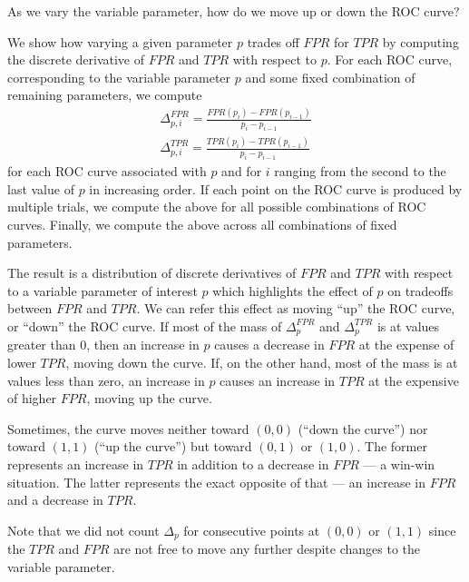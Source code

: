 As we vary the variable parameter, how do we move up or down the ROC curve?

We show how varying a given parameter $p$ trades off $FPR$ for $TPR$ by
computing the discrete derivative of $FPR$ and $TPR$ with respect to $p$. For
each ROC curve, corresponding to the variable parameter $p$ and some fixed
combination of remaining parameters, we compute
\begin{gather}
\Delta_{p,i}^{FPR} = \frac{FPR(p_{i}) - FPR(p_{i-1})}{p_i - p_{i-1}}\\
\Delta_{p,i}^{TPR} = \frac{TPR(p_{i}) - TPR(p_{i-1})}{p_i - p_{i-1}}
\end{gather}
for each ROC curve associated with $p$ and for $i$ ranging from the second to
the last value of $p$ in increasing order. If each point on the ROC curve is
produced by multiple trials, we compute the above for all possible combinations
of ROC curves. Finally, we compute the above across all combinations of fixed
parameters.

The result is a distribution of discrete derivatives of $FPR$ and $TPR$ with
respect to a variable parameter of interest $p$ which highlights the effect of
$p$ on tradeoffs between $FPR$ and $TPR$. We can refer this effect as moving
``up'' the ROC curve, or ``down'' the ROC curve. If most of the mass of
$\Delta_{p}^{FPR}$ and $\Delta_{p}^{TPR}$ is at values greater than 0, then an
increase in $p$ causes a decrease in $FPR$ at the expense of lower $TPR$, moving
down the curve. If, on the other hand, most of the mass is at values less than
zero, an increase in $p$ causes an increase in $TPR$ at the expensive of higher
$FPR$, moving up the curve.

Sometimes, the curve moves neither toward $(0,0)$ (``down the curve'') nor
toward $(1,1)$ (``up the curve'') but toward $(0,1)$ or $(1,0)$. The former
represents an increase in $TPR$ in addition to a decrease in $FPR$ --- a win-win
situation. The latter represents the exact opposite of that --- an increase in
$FPR$ and a decrease in $TPR$.

Note that we did not count $\Delta_p$ for consecutive points at $(0,0)$ or
$(1,1)$ since the $TPR$ and $FPR$ are not free to move any further despite
changes to the variable parameter.

